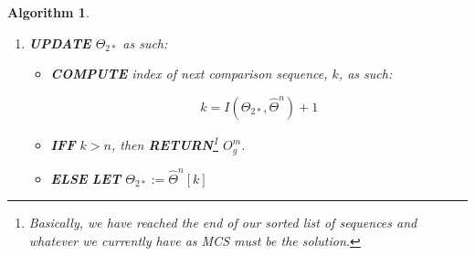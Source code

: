 \documentclass[a4paper, 18pt]{article} %
\newtheorem{alg}{Algorithm}
\newcommand{\invpi}{\rotatebox[origin=c]{180}{$\pi$}}
\begin{document}
\begin{alg}
\begin{enumerate}
{\begin{enumerate}
{\begin{itemize}
{ \vspace{1em}
\begin{equation}
f(\Theta_m[i],\Theta_{2*}[i]) = \begin{cases}
\Theta_m[i] & \Theta_m[i] == \Theta_{2*}[i],\\
0 & \Theta_m[i] \neq \Theta_{2*}[i]
\end{cases}
\end{equation}
 \vspace{1em}
 
 
 }
 \item \textbf{TRUNCATE}  $O^\phi$ to its longest non-zero/non-empty subsequence, and \textbf{SET} that as $\bar{O^\phi}$.
 \item \textbf{IFF}  $\invpi(\bar{O^\phi}) > \invpi(O^m_g)$, then \textbf{UPDATE} or replace $O^m_g$ with $\bar{O^\phi}$\\ $\implies$  $O^m_g := \bar{O^\phi}$
 \end{itemize}
}
\item{
\textbf{UPDATE}  $j \implies j := j + z$
}
\item {
\textbf{IFF}  $j = \invpi(\Theta_m) + \invpi(\Theta_{2*})$, then \textbf{GOTO}\footnote{At this juncture, we shall have essentially finished sliding the second sequence, $\Theta_{2*}$, past all the elements of the first sequence so that at $j = \invpi(\Theta_m) + \invpi(\Theta_{2*})$ there is nomore overlap possible, and so we can move on to the next sequence.} \textbf{Step\#9}
}
\item{\textbf{ELSE} \textbf{ITERATE}  from \textbf{Step\#c}}
\end{enumerate}
}

\item{ \textbf{UPDATE} $\Theta_{2*}$ as such:

\begin{itemize}
\item{ \textbf{COMPUTE} index of next comparison sequence, $k$, as such: 

\vspace{1em}
\begin{equation}
k = I(\Theta_{2*},{\hat{\Theta}}^n) + 1
\end{equation}
\vspace{1em}

}
\item \textbf{IFF} $k > n$, then \textbf{RETURN}\footnote{Basically, we have reached the end of our sorted list of sequences and whatever we currently have as MCS must be the solution.}  $O^m_g$.
\item \textbf{ELSE} \textbf{LET} $\Theta_{2*} := {\hat{\Theta}}^n[k]$


\end{itemize}}
\end{enumerate}
\end{alg}
\end{document}
